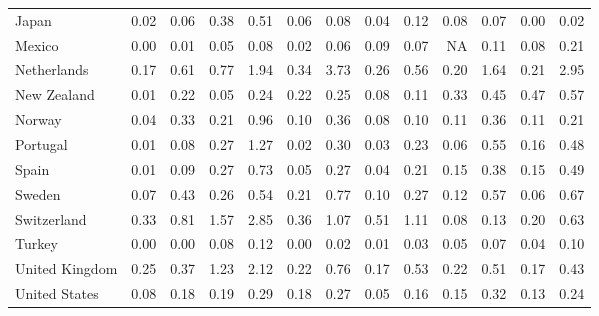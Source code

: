 \begin{table}[!h]
{\begin{tabular}[t]{lrrrrrrrrrrrr}
Japan & 0.02 & 0.06 & 0.38 & 0.51 & 0.06 & 0.08 & 0.04 & 0.12 & 0.08 & 0.07 & 0.00 & 0.02\\
Mexico & 0.00 & 0.01 & 0.05 & 0.08 & 0.02 & 0.06 & 0.09 & 0.07 & NA & 0.11 & 0.08 & 0.21\\
Netherlands & 0.17 & 0.61 & 0.77 & 1.94 & 0.34 & 3.73 & 0.26 & 0.56 & 0.20 & 1.64 & 0.21 & 2.95\\
\addlinespace
New Zealand & 0.01 & 0.22 & 0.05 & 0.24 & 0.22 & 0.25 & 0.08 & 0.11 & 0.33 & 0.45 & 0.47 & 0.57\\
Norway & 0.04 & 0.33 & 0.21 & 0.96 & 0.10 & 0.36 & 0.08 & 0.10 & 0.11 & 0.36 & 0.11 & 0.21\\
Portugal & 0.01 & 0.08 & 0.27 & 1.27 & 0.02 & 0.30 & 0.03 & 0.23 & 0.06 & 0.55 & 0.16 & 0.48\\
Spain & 0.01 & 0.09 & 0.27 & 0.73 & 0.05 & 0.27 & 0.04 & 0.21 & 0.15 & 0.38 & 0.15 & 0.49\\
Sweden & 0.07 & 0.43 & 0.26 & 0.54 & 0.21 & 0.77 & 0.10 & 0.27 & 0.12 & 0.57 & 0.06 & 0.67\\
\addlinespace
Switzerland & 0.33 & 0.81 & 1.57 & 2.85 & 0.36 & 1.07 & 0.51 & 1.11 & 0.08 & 0.13 & 0.20 & 0.63\\
Turkey & 0.00 & 0.00 & 0.08 & 0.12 & 0.00 & 0.02 & 0.01 & 0.03 & 0.05 & 0.07 & 0.04 & 0.10\\
United Kingdom & 0.25 & 0.37 & 1.23 & 2.12 & 0.22 & 0.76 & 0.17 & 0.53 & 0.22 & 0.51 & 0.17 & 0.43\\
United States & 0.08 & 0.18 & 0.19 & 0.29 & 0.18 & 0.27 & 0.05 & 0.16 & 0.15 & 0.32 & 0.13 & 0.24\\
\bottomrule
\end{tabular}}
\end{table}
